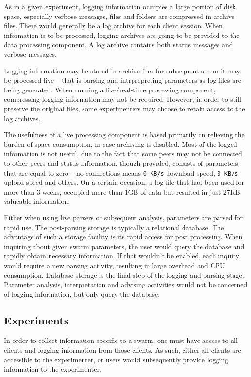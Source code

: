 As in a given experiment, logging information occupies a large portion of
disk space, especially verbose messages, files and folders are compressed in
archive files. There would generally be a log archive for each client session.
When information is to be processed, logging archives are going to be provided
to the data processing component. A log archive contains both status messages
and verbose messages.

Logging information may be stored in archive files for subsequent use or it
may be processed live -- that is parsing and intrprepreting parameters as log
files are being generated. When running a live/real-time processing component,
compressing logging information may not be required. However, in order to
still preserve the original files, some experimenters may choose to retain
access to the log archives.

The usefulness of a live processing component is based primarily on
relieving the burden of space consumption, in case archiving is disabled. Most
of the logged information is not useful, due to the fact that some peers may
not be connected to other peers and status information, though provided,
consists of parameters that are equal to zero -- no connections means
\texttt{0 KB/s} download speed, \texttt{0 KB/s} upload speed and others. On a
certain occasion, a log file that had been used for more than 3 weeks,
occupied more than 1GB of data but resulted in just 27KB valueable
information.

Either when using live parsers or subsequent analysis, parameters are parsed
for rapid use. The post-parsing storage is typically a relational database.
The advantage of such a storage facility is its rapid access for
post processing. When inquiring about given swarm parameters, the user would
query the database and rapidly obtain necessary information. If that wouldn't
be enabled, each inquiry would require a new parsing activity, resulting in
large overhead and CPU consumption. Database storage is the final step of the
logging and parsing stage. Parameter analysis, interpretation and advising
activities would not be concerned of logging information, but only query the
database.

\subsection{Experiments}

In order to collect information specific to a swarm, one must have access to
all clients and logging information from those clients. As such, either all
clients are accessible to the experimenter, or users would subsequently
provide logging information to the experimenter.

